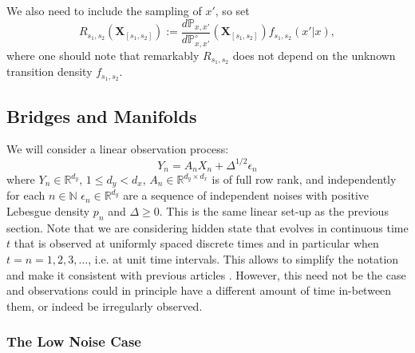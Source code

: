 \documentclass[english,13pt]{article}
\numberwithin{equation}{section}
\begin{document}
We also need to include the sampling of $x'$, so set %
$$
R_{s_1,s_2}(\mathbf{X}_{[s_1,s_2]}) := \frac{d\mathbb{P}_{x,x'} }{d \mathbb{P}^\circ_{x,x'} }(\mathbf{X}_{[s_1,s_2]})
f_{s_1,s_2}(x'|x),
$$
where one should note that remarkably $R_{s_1,s_2}$ does not depend on the unknown transition density $f_{s_1,s_2}$.




\subsection{Bridges and Manifolds}

We will consider a linear observation process:
$$
Y_n  = A_n X_n + \Delta^{1/2}\epsilon_n 
$$
where $Y_n\in\mathbb{R}^{d_y}$,  $1\leq d_y < d_x$,  $A_n\in\mathbb{R}^{d_y\times d_x}$ is of full row rank, 
and independently for each $n\in\mathbb{N}$  $\epsilon_n\in\mathbb{R}^{d_y}$ are a sequence of independent noises with positive Lebesgue density $p_n$
and $\Delta\geq 0$. %
This is the same linear set-up as the previous section. Note that we are considering hidden state that evolves in continuous time $t$ that is observed at uniformly spaced discrete times and in particular when $t=n=1,2,3,\ldots$, i.e. at unit time intervals. This allows to simplify the notation and make it consistent with previous articles \cite{beskos}.  However,  this need not be the case and observations could in principle have a different amount of time in-between them,  or indeed be irregularly observed.

\subsubsection{The Low Noise Case}\label{sec:ln_diff}
\end{document}
